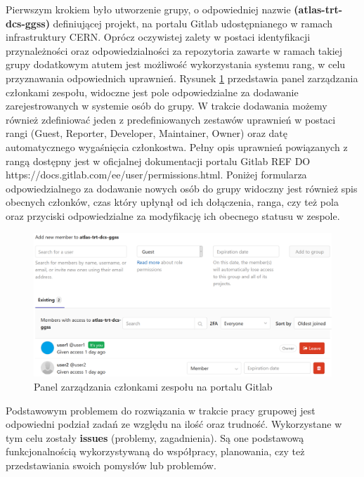 Pierwszym krokiem było utworzenie grupy, o odpowiedniej nazwie \textbf{(atlas-trt-dcs-ggss)} definiującej projekt, na portalu Gitlab udostępnianego w ramach infrastruktury CERN. Oprócz oczywistej zalety w postaci identyfikacji przynależności oraz odpowiedzialności za repozytoria zawarte w ramach takiej grupy dodatkowym atutem jest możliwość wykorzystania systemu rang, w celu przyznawania odpowiednich uprawnień. Rysunek \ref{fig:memMan} przedstawia panel zarządzania członkami zespołu, widoczne jest pole odpowiedzialne za dodawanie zarejestrowanych w systemie osób do grupy. W trakcie dodawania możemy również zdefiniować jeden z predefiniowanych zestawów uprawnień w postaci rangi (Guest, Reporter, Developer, Maintainer, Owner) oraz datę automatycznego wygaśnięcia członkostwa. Pełny opis uprawnień powiązanych z rangą dostępny jest w oficjalnej dokumentacji portalu Gitlab REF DO https://docs.gitlab.com/ee/user/permissions.html. Poniżej formularza odpowiedzialnego za dodawanie nowych osób do grupy widoczny jest również spis obecnych członków, czas który upłynął od ich dołączenia, ranga, czy też pola oraz przyciski odpowiedzialne za modyfikację ich obecnego statusu w zespole.

\begin{figure}[H]
\centering
\caption{Panel zarządzania członkami zespołu na portalu Gitlab}
\label{fig:memMan}
\includegraphics[width=\textwidth]{res/png/memberManagementPanel}
\end{figure}


Podstawowym problemem do rozwiązania w trakcie pracy grupowej jest odpowiedni podział zadań ze względu na ilość oraz trudność. Wykorzystane w tym celu zostały \textbf{issues} (problemy, zagadnienia). Są one podstawową funkcjonalnością wykorzystywaną do współpracy, planowania, czy też przedstawiania swoich pomysłów lub problemów.

